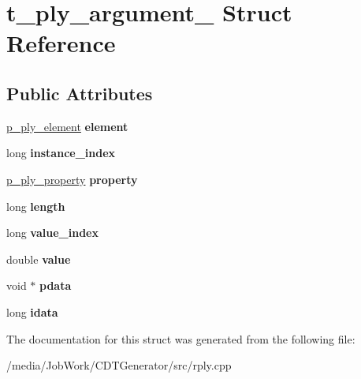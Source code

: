 \hypertarget{structt__ply__argument__}{\section{t\-\_\-ply\-\_\-argument\-\_\- Struct Reference}
\label{structt__ply__argument__}
}
\subsection*{Public Attributes}
\begin{DoxyCompactItemize}
\item 
\hypertarget{structt__ply__argument___a958bc37961f8ee44b39f72f0b221c0d7}{\hyperlink{structt__ply__element__}{p\-\_\-ply\-\_\-element} {\bfseries element}}\label{structt__ply__argument___a958bc37961f8ee44b39f72f0b221c0d7}

\item 
\hypertarget{structt__ply__argument___ab0d8232410a2a77eb842892f3dddcb08}{long {\bfseries instance\-\_\-index}}\label{structt__ply__argument___ab0d8232410a2a77eb842892f3dddcb08}

\item 
\hypertarget{structt__ply__argument___af38f3661a7ba2930c910027bd36790c4}{\hyperlink{structt__ply__property__}{p\-\_\-ply\-\_\-property} {\bfseries property}}\label{structt__ply__argument___af38f3661a7ba2930c910027bd36790c4}

\item 
\hypertarget{structt__ply__argument___aaa7b3d7dca197835d72adaf12f9ec1ed}{long {\bfseries length}}\label{structt__ply__argument___aaa7b3d7dca197835d72adaf12f9ec1ed}

\item 
\hypertarget{structt__ply__argument___a5b407c90440ee9f5a14b8816808cb658}{long {\bfseries value\-\_\-index}}\label{structt__ply__argument___a5b407c90440ee9f5a14b8816808cb658}

\item 
\hypertarget{structt__ply__argument___ab4b092f2a002c13a39c251051d620b31}{double {\bfseries value}}\label{structt__ply__argument___ab4b092f2a002c13a39c251051d620b31}

\item 
\hypertarget{structt__ply__argument___a33ffaef6d9affc8dd4322fff0856fd3e}{void $\ast$ {\bfseries pdata}}\label{structt__ply__argument___a33ffaef6d9affc8dd4322fff0856fd3e}

\item 
\hypertarget{structt__ply__argument___a17560fa022ed7b8cffd9db501177a514}{long {\bfseries idata}}\label{structt__ply__argument___a17560fa022ed7b8cffd9db501177a514}

\end{DoxyCompactItemize}


The documentation for this struct was generated from the following file\-:\begin{DoxyCompactItemize}
\item 
/media/\-Job\-Work/\-C\-D\-T\-Generator/src/rply.\-cpp\end{DoxyCompactItemize}

